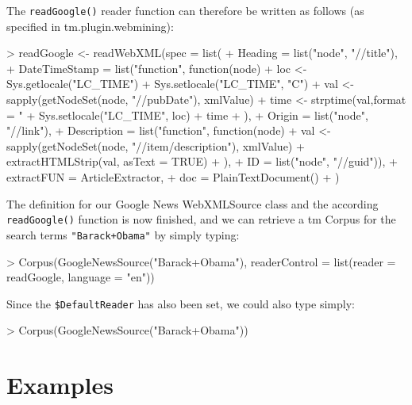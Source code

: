 \documentclass[a4paper]{article}
\newcommand{\class}[1]{\mbox{\textsf{#1}}}
\newcommand{\code}[1]{\mbox{\texttt{#1}}}
\newcommand{\pkg}[1]{{\normalfont\fontseries{b}\selectfont #1}}
\newcommand{\fkt}[1]{\code{#1()}}
\newcommand{\field}[1]{\code{\$#1}}
\begin{document}
The \fkt{readGoogle} reader function can therefore be written as follows (as specified in \pkg{tm.plugin.webmining}):
\begin{Schunk}
\begin{Sinput}
> readGoogle <- readWebXML(spec = list(
+ 		Heading = list("node", "//title"),
+ 		DateTimeStamp = list("function", function(node){
+ 					loc <- Sys.getlocale("LC_TIME")
+ 					Sys.setlocale("LC_TIME", "C")
+ 					val <- sapply(getNodeSet(node, "//pubDate"), xmlValue)
+ 					time <- strptime(val,format = "%
+ 					Sys.setlocale("LC_TIME", loc)
+ 					time
+ 				}),
+ 		Origin = list("node", "//link"),
+ 		Description = list("function", function(node){
+ 					val <- sapply(getNodeSet(node, "//item/description"), xmlValue)
+ 					extractHTMLStrip(val, asText = TRUE)
+ 				}),
+ 		ID = list("node",  "//guid")),
+ 	extractFUN = ArticleExtractor,
+ 	doc = PlainTextDocument()
+ )
\end{Sinput}
\end{Schunk}
The definition for our Google News \class{WebXMLSource} class and the according \fkt{readGoogle} function
is now finished, and we can retrieve a \pkg{tm} \class{Corpus} for the search terms \code{"Barack+Obama"} by simply
typing:
\begin{Schunk}
\begin{Sinput}
> Corpus(GoogleNewsSource("Barack+Obama"), readerControl = list(reader = readGoogle, language = "en"))
\end{Sinput}
\end{Schunk}
Since the \field{DefaultReader} has also been set, we could also type simply:
\begin{Schunk}
\begin{Sinput}
> Corpus(GoogleNewsSource("Barack+Obama"))
\end{Sinput}
\end{Schunk}


\section{Examples}
\end{document}
